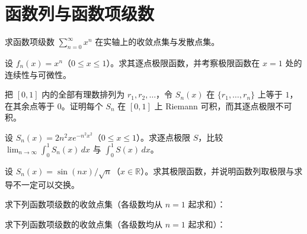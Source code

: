 \renewcommand{\thesection}{\arabic{section}}\renewcommand{\theHsection}{chapter.\arabic{section}}\setcounter{section}{14}\section{函数列与函数项级数}
\noindent\begin{minipage}{\textwidth}
求函数项级数 $\sum_{n=0}^{\infty}x^n$ 在实轴上的收敛点集与发散点集。
\end{minipage}\par\vfill
\noindent\begin{minipage}{\textwidth}
设 $f_n(x)=x^n$（$0\le x\le1$）。求其逐点极限函数，并考察极限函数在 $x=1$ 处的连续性与可微性。
\end{minipage}\par\vfill
\noindent\begin{minipage}{\textwidth}
把 $[0,1]$ 内的全部有理数排列为 $r_1,r_2,\ldots$，令 $S_n(x)$ 在 $\{r_1,\ldots,r_n\}$ 上等于 $1$，在其余点等于 $0$。证明每个 $S_n$ 在 $[0,1]$ 上 Riemann 可积，而其逐点极限不可积。
\end{minipage}\par\vfill
\newpage
\noindent\begin{minipage}{\textwidth}
设 $S_n(x)=2n^2xe^{-n^2x^2}$（$0\le x\le1$）。求逐点极限 $S$，比较 $\lim_{n\to\infty}\int_0^1S_n(x)\,dx$ 与 $\int_0^1S(x)\,dx$。
\end{minipage}\par\vfill
\noindent\begin{minipage}{\textwidth}
设 $S_n(x)=\sin(nx)/\sqrt n$（$x\in\mathbb R$）。求其极限函数，并说明函数列取极限与求导不一定可以交换。
\end{minipage}\par\vfill
\noindent\begin{minipage}{\textwidth}
求下列函数项级数的收敛点集（各级数均从 $n=1$ 起求和）：
\end{minipage}\par\vfill
\newpage
\noindent\begin{minipage}{\textwidth}
求下列函数项级数的收敛点集（各级数均从 $n=1$ 起求和）：
\end{minipage}\par\vfill
